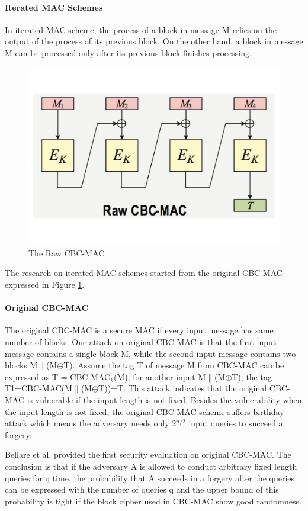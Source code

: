 \documentclass{article}
\begin{document}
\paragraph{Iterated MAC Schemes}
In iterated MAC scheme, the process of a block in message M relies on the output of the process of its previous block. On the other hand, a block in message M can be processed only after its previous block finishes processing. 
\begin{figure}[htbp]
\centering
\includegraphics[scale=0.3]{./diagrams/cbc-mac.pdf}
\caption{The Raw CBC-MAC}
\label{fig:CBC-mac}
\end{figure}
The research on iterated MAC schemes started from the original CBC-MAC expressed in Figure \ref{fig:CBC-mac}.
\paragraph{Original CBC-MAC}
The original CBC-MAC is a secure MAC if every input message has same number of blocks. One attack on original CBC-MAC is that the first input message contains a single block M, while the second input message contains two blocks M$\|$(M$\oplus$T). Assume the tag T of message M from CBC-MAC can be expressed as T = CBC-MAC$_k$(M), for another input M$\|$(M$\oplus$T), the tag T1=CBC-MAC(M$\|$(M$\oplus$T))=T. This attack indicates that the original CBC-MAC is vulnerable if the input length is not fixed.
Besides the vulnerability when the input length is not fixed, the original CBC-MAC scheme suffers birthday attack which means the adversary needs only 2$^{n/2}$ input queries to succeed a forgery. 

Bellare et al. provided the first security evaluation on original CBC-MAC\cite{cbc1994}. The conclusion is that if the adversary A is allowed to conduct arbitrary fixed length queries for q time, the probability that A succeeds in a forgery after the queries can be expressed with the number of queries q and the upper bound of this probability is tight if the block cipher used in CBC-MAC show good randomness.  
\end{document}
